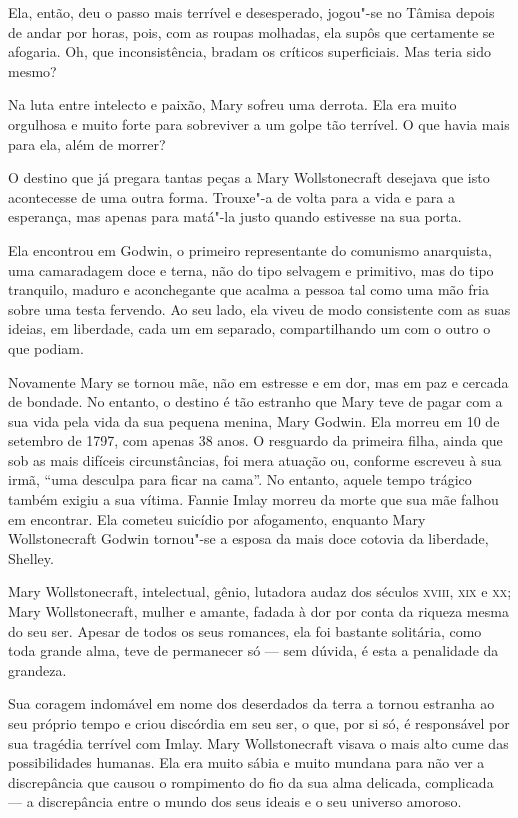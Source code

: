 Ela, então, deu o passo mais terrível e desesperado, jogou"-se no Tâmisa
depois de andar por horas, pois, com as roupas molhadas, ela supôs que
certamente se afogaria. Oh, que inconsistência, bradam os críticos
superficiais. Mas teria sido mesmo?

Na luta entre intelecto e paixão, Mary sofreu uma derrota. Ela era muito
orgulhosa e muito forte para sobreviver a um golpe tão terrível. O que
havia mais para ela, além de morrer?

O destino que já pregara tantas peças a Mary Wollstonecraft desejava que
isto acontecesse de uma outra forma. Trouxe"-a de volta para a vida e para a
esperança, mas apenas para matá"-la justo quando estivesse na sua porta.

Ela encontrou em Godwin, o primeiro representante do comunismo
anarquista, uma camaradagem doce e terna, não do tipo selvagem e
primitivo, mas do tipo tranquilo, maduro e aconchegante que acalma a
pessoa tal como uma mão fria sobre uma testa fervendo. Ao seu lado, ela
viveu de modo consistente com as suas ideias, em liberdade, cada um em
separado, compartilhando um com o outro o que podiam.

Novamente Mary se tornou mãe, não em estresse e em dor, mas em paz e
cercada de bondade. No entanto, o destino é tão estranho que Mary teve
de pagar com a sua vida pela vida da sua pequena menina, Mary Godwin.
Ela morreu em 10 de setembro de 1797, com apenas 38 anos. O resguardo da
primeira filha, ainda que sob as mais difíceis circunstâncias, foi mera
atuação ou, conforme escreveu à sua irmã, ``uma desculpa para ficar na
cama''. No entanto, aquele tempo trágico também exigiu a sua vítima.
Fannie Imlay morreu da morte que sua mãe falhou em encontrar. Ela
cometeu suicídio por afogamento, enquanto Mary Wollstonecraft Godwin
tornou"-se a esposa da mais doce cotovia da liberdade, Shelley.

Mary Wollstonecraft, intelectual, gênio, lutadora audaz dos séculos
\textsc{xviii}, \textsc{xix} e \textsc{xx}; Mary Wollstonecraft, mulher e amante, fadada à dor por
conta da riqueza mesma do seu ser. Apesar de todos os seus romances, ela
foi bastante solitária, como toda grande alma, teve de permanecer só --- sem
dúvida, é esta a penalidade da grandeza.

Sua coragem indomável em nome dos deserdados da terra a tornou estranha
ao seu próprio tempo e criou discórdia em seu ser, o que, por si só, é
responsável por sua tragédia terrível com Imlay. Mary Wollstonecraft
visava o mais alto cume das possibilidades humanas. Ela era muito sábia
e muito mundana para não ver a discrepância que causou o rompimento do fio da sua alma delicada, complicada --- a discrepância entre o mundo dos seus ideais e o seu universo amoroso.

